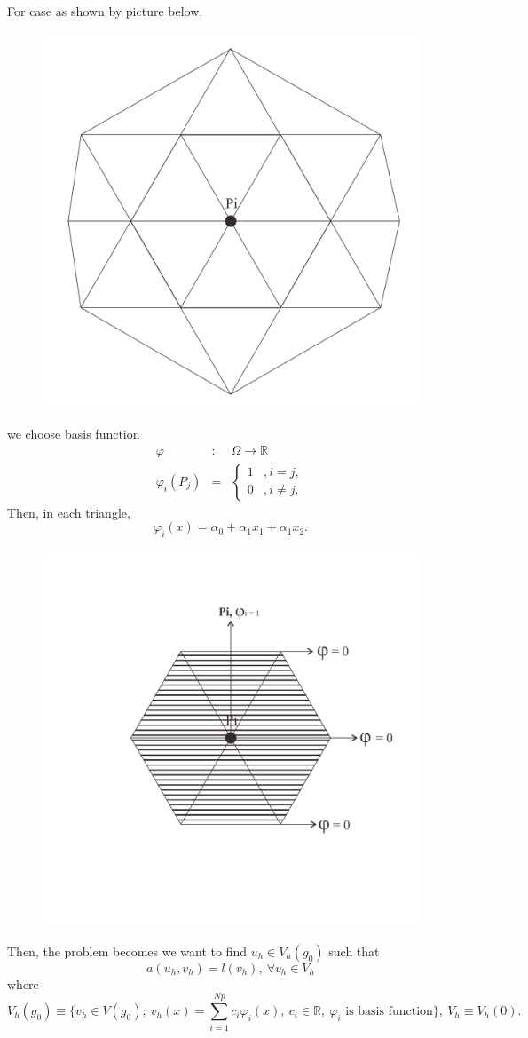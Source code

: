 \documentclass[a4paper,10pt]{article}
\begin{document}
\vspace{4cm}

For case as shown by picture below,

\begin{figure}[h!]
	\centering
	\includegraphics[width=0.5\linewidth]{picture/casepict}
	\caption{}
	\label{fig:casepict}
\end{figure}

we choose basis function
\begin{eqnarray}\nonumber
\varphi &:& \Omega \rightarrow \mathbb{R}\\ \nonumber
\varphi_{i} (P_{j}) &=& \begin{cases}
1 &, i=j, \\
0 &, i \neq j. 
\end{cases}
\end{eqnarray}
Then, in each triangle,
\[ \varphi_{i}(x) = \alpha_{0} + \alpha_{1}x_{1} + \alpha_{1}x_{2}. \]

\begin{figure}[h!]
	\centering
	\includegraphics[width=0.4\linewidth]{picture/eachtriangle}
	\caption{}
	\label{fig:eachtriangle}
\end{figure}


Then, the problem becomes we want to find $ u_{h} \in V_{h}(g_{0}) $ such that
\[ a(u_{h}, v_{h}) = l(v_{h}), \ \forall v_{h} \in V_{h} \]
where
\[ V_{h}(g_{0}) \equiv \{ v_{h} \in V(g_{0}); \ v_{h}(x) = \sum_{i=1}^{Np} c_{i} \varphi_{i}(x), \ c_{i} \in \mathbb{R}, \ \varphi_{i} \text{ is basis function} \} , \ V_{h} \equiv V_{h}(0). \]
\end{document}
